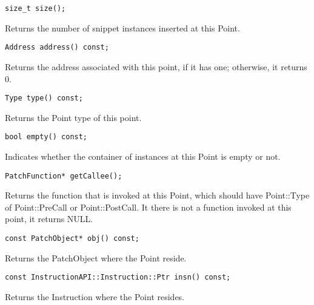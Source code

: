 \begin{verbatim}
size_t size();

\end{verbatim}



Returns the number of snippet instances inserted at this Point.


\begin{verbatim}
Address address() const;

\end{verbatim}



Returns the address associated with this point, if it has one; otherwise, it
returns 0.


\begin{verbatim}
Type type() const;

\end{verbatim}



Returns the Point type of this point.


\begin{verbatim}
bool empty() const;

\end{verbatim}



Indicates whether the container of instances at this Point is empty or not.


\begin{verbatim}
PatchFunction* getCallee();

\end{verbatim}



Returns the function that is invoked at this Point, which should have
Point::Type of Point::PreCall or Point::PostCall. It there is not a function
invoked at this point, it returns NULL.


\begin{verbatim}
const PatchObject* obj() const;

\end{verbatim}



Returns the PatchObject where the Point reside.


\begin{verbatim}
const InstructionAPI::Instruction::Ptr insn() const;

\end{verbatim}



Returns the Instruction where the Point resides.


